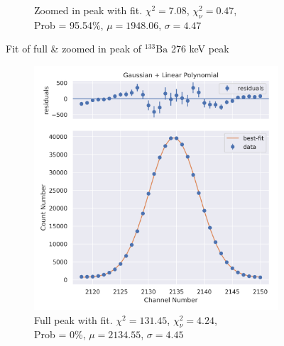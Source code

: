 \documentclass[11pt,a4paper]{article}
\newcommand{\element}[2]{$^{#2}\textrm{#1}$}
\begin{document}
\begin{figure}[H]
\begin{subfigure}{.5\linewidth}
    \caption{Zoomed in peak with fit. $\chi^2 = 7.08$, $\chi^2_\nu = 0.47$, \\ Prob = 95.54\%, $\mu = 1948.06$, $\sigma = 4.47$}
  \end{subfigure}
  \caption{Fit of full \& zoomed in peak of \element{Ba}{133} 276 keV peak}
\end{figure}
\begin{figure}[H]
  \centering
  \begin{subfigure}{.5\linewidth}
    \centering
    \includegraphics[width=\linewidth]{./Images/Barium133/Linear/Linear_5_Full.png}
    \caption{Full peak with fit. $\chi^2 = 131.45$, $\chi^2_\nu = 4.24$, \\ Prob = 0\%, $\mu = 2134.55$, $\sigma = 4.45$}
  \end{subfigure}%
  \begin{subfigure}{.5\linewidth}
    \centering

\end{subfigure}
\end{figure}
\end{document}

